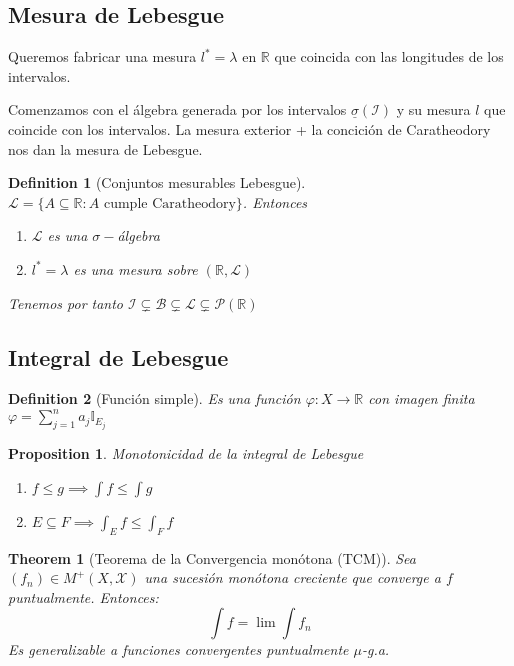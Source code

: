\documentclass{myclass}
\newtheorem*{definition}{Definition}
\newtheorem*{theorem}{Theorem}
\newtheorem*{proposition}{Proposition}
\begin{document}
\subsection{Mesura de Lebesgue}
Queremos fabricar una mesura $l^*=\lambda$ en $\mathbb{R}$ que coincida con las longitudes de los intervalos.

Comenzamos con el álgebra generada por los intervalos $\underline{\sigma }(\mathcal{I})$ y su mesura $l$ que coincide con los intervalos. La mesura exterior + la concición de Caratheodory nos dan la mesura de Lebesgue.

\begin{definition}[Conjuntos mesurables Lebesgue]$ \mathcal{L} =  \{A\subseteq \mathbb{R}: A \text{ cumple Caratheodory}\}$. Entonces
  \begin{enumerate}[topsep=-6pt, itemsep=0pt]
    \item $\mathcal{L}$ es una $\sigma-$álgebra
	\item $l^*=\lambda$ es una mesura sobre $(\mathbb{R}, \mathcal{L})$
  \end{enumerate}

  Tenemos por tanto $\mathcal{I} \subsetneq \mathcal{B} \subsetneq \mathcal{L} \subsetneq \mathcal{P}(\mathbb{R}) $

\end{definition}

\subsection{Integral de Lebesgue}
\begin{definition}[Función simple]
Es una función $\varphi : X \to \mathbb{R}$ con imagen finita $\varphi = \sum_{j=1}^n a_j \mathbb{I}_{E_j}$
\end{definition}

\begin{proposition}
Monotonicidad de la integral de Lebesgue 
\begin{enumerate}[topsep=-6pt, itemsep=0pt]
  \item $f\le g \implies \int f \le \int g$
  \item $E\subseteq F \implies \int_E f\le \int_F f$
\end{enumerate}
\end{proposition}

\begin{theorem}[Teorema de la Convergencia monótona (TCM)]
Sea $(f_n) \in M^+(X, \mathcal{X})$ una sucesión monótona creciente que converge a $f$ puntualmente. Entonces:
\[
\int f= \lim \int f_n
\] 
Es generalizable a funciones convergentes puntualmente $\mu$-g.a.
\end{theorem}
\end{document}
